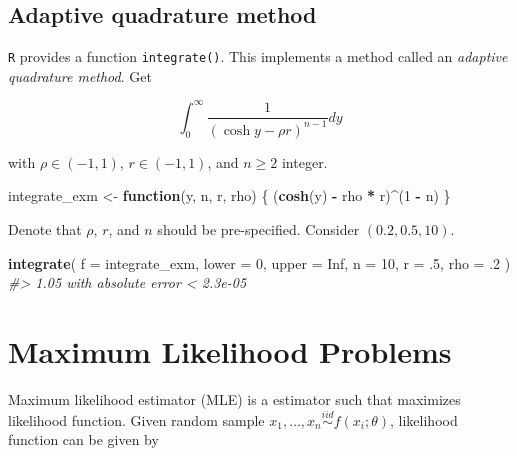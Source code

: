 \documentclass[]{book}
\newenvironment{Shaded}{\begin{snugshade}}{\end{snugshade}}
\newcommand{\CommentTok}[1]{\textcolor[rgb]{0.56,0.35,0.01}{\textit{#1}}}
\newcommand{\ControlFlowTok}[1]{\textcolor[rgb]{0.13,0.29,0.53}{\textbf{#1}}}
\newcommand{\DataTypeTok}[1]{\textcolor[rgb]{0.13,0.29,0.53}{#1}}
\newcommand{\DecValTok}[1]{\textcolor[rgb]{0.00,0.00,0.81}{#1}}
\newcommand{\FloatTok}[1]{\textcolor[rgb]{0.00,0.00,0.81}{#1}}
\newcommand{\KeywordTok}[1]{\textcolor[rgb]{0.13,0.29,0.53}{\textbf{#1}}}
\newcommand{\NormalTok}[1]{#1}
\newcommand{\OperatorTok}[1]{\textcolor[rgb]{0.81,0.36,0.00}{\textbf{#1}}}
\newcommand{\OtherTok}[1]{\textcolor[rgb]{0.56,0.35,0.01}{#1}}
\newcommand{\StringTok}[1]{\textcolor[rgb]{0.31,0.60,0.02}{#1}}
\theoremstyle{definition}
\theoremstyle{definition}
\theoremstyle{definition}
\theoremstyle{remark}
\begin{document}
\hypertarget{adaptive-quadrature-method}{%
\subsection{Adaptive quadrature method}\label{adaptive-quadrature-method}}

\texttt{R} provides a function \texttt{integrate()}. This implements a method called an \emph{adaptive quadrature method}. Get

\[\int_0^{\infty} \frac{1}{(\cosh y - \rho r)^{n - 1}}dy\]

with \(\rho \in (-1, 1)\), \(r \in (-1, 1)\), and \(n \ge 2\) integer.

\begin{Shaded}
\begin{Highlighting}[]
\NormalTok{integrate_exm <-}\StringTok{ }\ControlFlowTok{function}\NormalTok{(y, n, r, rho) \{}
\NormalTok{  (}\KeywordTok{cosh}\NormalTok{(y) }\OperatorTok{-}\StringTok{ }\NormalTok{rho }\OperatorTok{*}\StringTok{ }\NormalTok{r)}\OperatorTok{^}\NormalTok{(}\DecValTok{1} \OperatorTok{-}\StringTok{ }\NormalTok{n)}
\NormalTok{\}}
\end{Highlighting}
\end{Shaded}

Denote that \(\rho\), \(r\), and \(n\) should be pre-specified. Consider \((0.2, 0.5, 10)\).

\begin{Shaded}
\begin{Highlighting}[]
\KeywordTok{integrate}\NormalTok{(}
  \DataTypeTok{f =}\NormalTok{ integrate_exm,}
  \DataTypeTok{lower =} \DecValTok{0}\NormalTok{,}
  \DataTypeTok{upper =} \OtherTok{Inf}\NormalTok{,}
  \DataTypeTok{n =} \DecValTok{10}\NormalTok{,}
  \DataTypeTok{r =} \FloatTok{.5}\NormalTok{,}
  \DataTypeTok{rho =} \FloatTok{.2}
\NormalTok{)}
\CommentTok{#> 1.05 with absolute error < 2.3e-05}
\end{Highlighting}
\end{Shaded}

\hypertarget{maximum-likelihood-problems}{%
\section{Maximum Likelihood Problems}\label{maximum-likelihood-problems}}

Maximum likelihood estimator (MLE) is a estimator such that maximizes likelihood function. Given random sample \(x_1, \ldots, x_n \stackrel{iid}{\sim}f(x_i ; \theta)\), likelihood function can be given by
\end{document}

